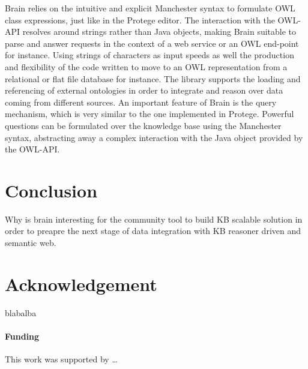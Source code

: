 \documentclass{bioinfo}
\begin{document}
Brain relies on the intuitive and explicit Manchester syntax to formulate OWL class expressions, just like in the Protege editor.
The interaction with the OWL-API resolves around strings rather than Java objects, making Brain suitable to parse and answer requests in 
the context of a web service or an OWL end-point for instance. Using strings of characters as input speeds as well the production 
and flexibility of the code written to move to an OWL representation from a relational or flat file database for instance.
The library supports the loading and referencing of external ontologies in order to integrate and reason
over data coming from different sources. An important feature of Brain is the query mechanism, which is very similar to 
the one implemented in Protege. Powerful questions can be formulated over the knowledge base using the Manchester syntax, abstracting
away a complex interaction with the Java object provided by the OWL-API.

\section{Conclusion}
Why is brain interesting for the community
tool to build KB scalable solution in order to preapre the next stage of data integration with KB reasoner driven and semantic web.


\section*{Acknowledgement}
blabalba
\paragraph{Funding\textcolon}
This work was supported by …
 









\end{document}
